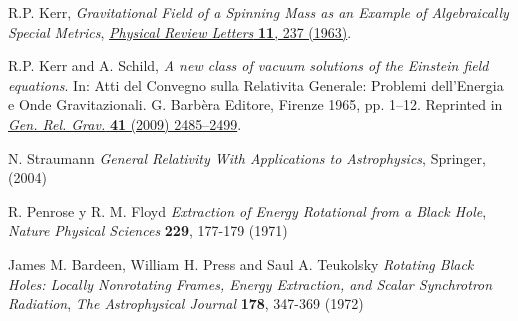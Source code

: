 \begin{thebibliography}{99}
 R.P. Kerr, {\em Gravitational Field of a Spinning Mass as an Example of Algebraically Special Metrics}, \href{https://doi.org/10.1103/PhysRevLett.11.237}{{\sl Physical Review Letters } {\bf 11}, 237 (1963)}.

 R.P. Kerr and A. Schild, {\em A new class of vacuum solutions of the Einstein field equations}. In: Atti del Convegno sulla Relativita Generale: Problemi dell’Energia e Onde Gravitazionali. G. Barbèra Editore, Firenze 1965, pp. 1–12. Reprinted in \href{http://dx.doi.org/10.1007/s10714-009-0856-0}{{\sl Gen. Rel. Grav.} {\bf 41} (2009) 2485--2499}. 

 N. Straumann {\em General Relativity With Applications to Astrophysics}, Springer, (2004)

 R. Penrose y R. M. Floyd {\em Extraction of Energy Rotational from a Black Hole}, {\sl Nature Physical Sciences} {\bf 229}, 177-179 (1971)

 James M. Bardeen, William H. Press and Saul A. Teukolsky {\em Rotating Black Holes: Locally Nonrotating Frames, Energy Extraction, and Scalar Synchrotron Radiation}, {\sl The Astrophysical Journal} {\bf 178}, 347-369 (1972)
\end{thebibliography}
